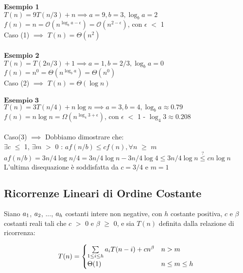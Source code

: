 \documentclass[../cheatSheetAlgoritmi.tex]{subfiles}
\begin{document}
\textbf{Esempio 1}\\
$T(n) = 9T(n/3) + n \implies a = 9, b = 3, \log_{b}{a} = 2$\\
$f(n) = n = \mathcal{O}(n^{\log_{b}{a} - \epsilon}) =  \mathcal{O}(n^{2 - \epsilon})$, con $\epsilon$ $<$ 1\\
Caso (1) $\implies$ $T(n) = \Theta(n^{2})$\\\\
\textbf{Esempio 2}\\
$T(n) = T(2n/3) + 1 \implies a = 1, b = 2/3, \log_{b}{a} = 0$\\
$f(n) = n^{0} = \Theta(n^{\log_{b}{a}}) =  \Theta(n^{0})$\\
Caso (2) $\implies$ $T(n) = \Theta(\log{n})$\\\\
$\textbf{Esempio 3}$\\
$T(n) = 3T(n/4) + n\log{n} \implies a = 3, b = 4, \log_{b}{a} \approx 0.79$\\
$f(n) = n\log{n} = \Omega(n^{\log_{4}{3} + \epsilon})$, con $\epsilon$ $<$ 1 - $\log_{4}{3} \approx 0.208$\\\\
Caso(3) $\implies$ Dobbiamo dimostrare che:\\
$\exists c$ $\leq$ 1, $\exists m$ $>$ 0 : $af(n/b) \leq cf(n), \forall n$ $\geq$ $m$\\
$af(n/b) = 3n/4\log{n/4} = 3n/4\log{n} - 3n/4\log{4} \leq 3n/4\log{n} \stackrel{?}{\leq} cn\log{n}$\\
L'ultima disequazione è soddisfatta da $c = 3/4$ e $m = 1$

\subsection{Ricorrenze Lineari di Ordine Costante}
Siano $a\textsubscript{$1$}$, $a\textsubscript{$2$}$, $...$, $a\textsubscript{$h$}$ costanti intere non negative, con $h$ costante positiva, $c$ e $\beta$ costanti reali tali che $c$ $>$ 0 e $\beta$ $\geq$ 0, e sia $T(n)$ definita dalla relazione di ricorrenza:
\begin{center}
	\begin{equation*}
  		T(n)=\begin{cases}
     		\sum\limits_{1 \leq i \leq h} {a \textsubscript{$i$} T(n-i)} + cn^{\beta} & \text{$n > m$}\\
    		\Theta(1) & \text{$n \leq m \leq h$}
  		\end{cases}
	\end{equation*}
\end{center}
\end{document}
